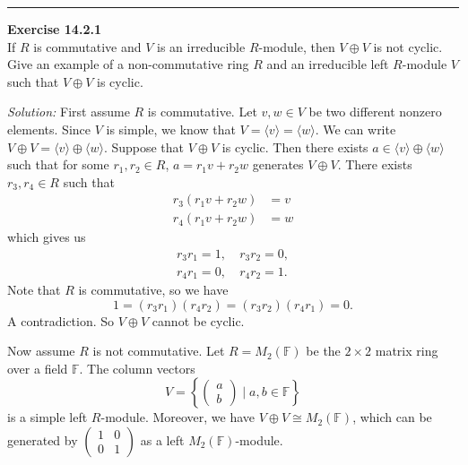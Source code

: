 \documentclass[a4paper, 12pt]{article}
\newenvironment{problem}[2][Exercise]
    { \begin{mdframed}[backgroundcolor=gray!20] \textbf{#1 #2} \\}
    {  \end{mdframed}}
\newenvironment{solution}
    {\textit{Solution:}}
    {}
\newcommand{\la}{\langle}
\newcommand{\ra}{\rangle}
\begin{document}
\noindent\rule{7in}{2.8pt}
\begin{problem}{14.2.1}
If \(R\) is commutative and \(V\) is an irreducible \(R\)-module, then \(V\oplus V\) is not cyclic. Give an example of a non-commutative ring \(R\) and an irreducible left \(R\)-module \(V\) such that 
\(V\oplus V\) is cyclic.
\end{problem}
\begin{solution}
First assume \(R\) is commutative. Let \(v,w\in V\) be two different nonzero elements. Since \(V\) is simple, we know that \(V=\la v\ra=\la w\ra\). We can write \(V\oplus V=\la v\ra\oplus \la w\ra\). Suppose that \(V\oplus V\) is cyclic. Then there exists \(a\in \la v\ra\oplus \la w\ra\) such 
that for some \(r_1,r_2\in R\), \(a=r_1v+r_2w\) generates \(V\oplus V\). There exists \(r_3,r_4\in R\) such that 
\begin{align*}
    r_3(r_1v+r_2w)&=v\\ 
    r_4(r_1v+r_2w)&=w
\end{align*}
which gives us 
\begin{align*}
    r_3r_1=1,&\ r_3r_2=0,\\
    r_4r_1=0,&\ r_4r_2=1. 
\end{align*}
Note that \(R\) is commutative, so we have 
\[1=(r_3r_1)(r_4r_2)=(r_3r_2)(r_4r_1)=0.\]
A contradiction. So \(V\oplus V\) cannot be cyclic. 

Now assume \(R\) is not commutative. Let \(R=M_2(\mathbb{F})\) be the \(2\times 2\) matrix ring over a field \(\mathbb{F}\). The column vectors 
\[V=\left\{ \begin{pmatrix}
a\\ 
b
\end{pmatrix}\mid a,b\in \mathbb{F} \right\}\]
is a simple left \(R\)-module. Moreover, we have \(V\oplus V\cong M_2(\mathbb{F})\), which can be generated by \(\begin{pmatrix}
    1&0\\
    0&1
\end{pmatrix}\) as a left \(M_2(\mathbb{F})\)-module.
\end{solution}
\end{document}

